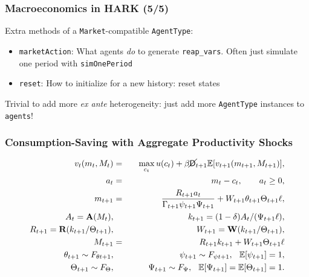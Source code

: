 \documentclass[11ptt]{beamer}
\newcommand{\E}{\mathbb{E}}
\newcommand{\bi}{\begin{itemize}}
\newcommand{\ei}{\end{itemize}}
\newcommand{\Die}{\mathsf{D}}
\newcommand{\Live}{\cancel{\Die}}
\begin{document}
\begin{frame}
\frametitle{Macroeconomics in HARK (5/5)}
Extra methods of a \texttt{Market}-compatible \texttt{AgentType}:
\bi
\item \texttt{marketAction}: What agents \textit{do} to generate \texttt{reap\_vars}.  Often just simulate one period with \texttt{simOnePeriod}

\item \texttt{reset}: How to initialize for a new history: reset states
\ei

Trivial to add more \textit{ex ante} heterogeneity: just add more \texttt{AgentType} instances to \texttt{agents}!
\end{frame}



\begin{frame}
\frametitle{Consumption-Saving with Aggregate Productivity Shocks}
\begin{eqnarray*}
v_t(m_t,M_t) &=& \max_{c_t} u(c_t) + \beta \Live_{t+1} \E [v_{t+1}(m_{t+1},M_{t+1}) ], \\
a_t &=& m_t - c_t, \qquad a_t \geq 0, \\
m_{t+1} &=& \frac{R_{t+1} a_t}{\Gamma_{t+1}\psi_{t+1} \Psi_{t+1}}  + W_{t+1} \theta_{t+1} \Theta_{t+1} \ell, \\
A_t = \textbf{A}({M_t}),  & & k_{t+1} = (1-\delta)A_t/(\Psi_{t+1} \ell), \\
R_{t+1} = \textbf{R}(k_{t+1}/\Theta_{t+1}), & & W_{t+1} = \textbf{W}(k_{t+1}/\Theta_{t+1}), \\
M_{t+1} &=& R_{t+1} k_{t+1} + W_{t+1} \Theta_{t+1} \ell \\
\theta_{t+1} \sim F_{\theta t+1}, &\qquad& \psi_{t+1} \sim F_{\psi t+1}, \hspace{0.25cm} \E[\psi_{t+1}] = 1, \\
\Theta_{t+1} \sim F_{\Theta}, &\qquad& \Psi_{t+1} \sim F_{\Psi}, \hspace{0.25cm} \E[\Psi_{t+1}] = \E[\Theta_{t+1}] = 1.
\end{eqnarray*}
\end{frame}
\end{document}
